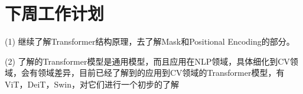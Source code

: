 \documentclass[letterpaper,10pt]{article}
\begin{document}
	
	\section{下周工作计划}
	
	(1) 继续了解Transformer结构原理，去了解Mask和Positional Encoding的部分。
	
	(2) 了解的Transformer模型是通用模型，而且应用在NLP领域，具体细化到CV领域，会有领域差异，目前已经了解到的应用到CV领域的Transformer模型，有ViT，DeiT，Swin，对它们进行一个初步的了解
	
	
	
\end{document}
